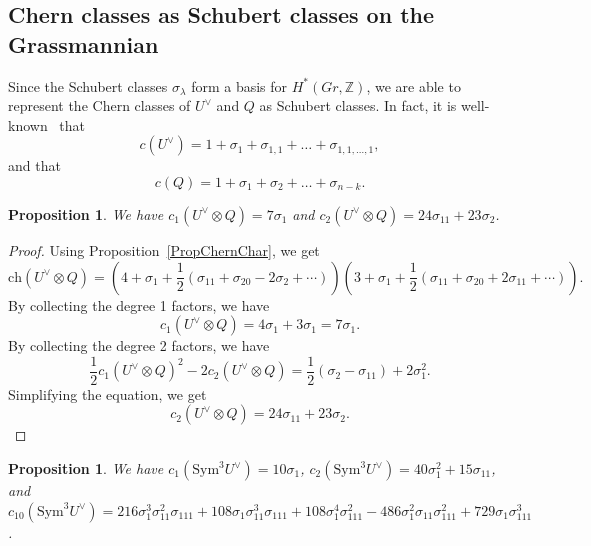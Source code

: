 \documentclass{article}
\newtheorem{proposition}[theorem]{Proposition}
\theoremstyle{definition}
\begin{document}
\subsection{Chern classes as Schubert classes on the Grassmannian}

Since the Schubert classes $\sigma_\lambda$ form a basis for $H^*(Gr, \mathbb Z)$, we are able to represent the Chern classes of $U^\vee$ and $Q$ as Schubert classes. In fact, it is well-known~\cite[Section 5.6.2]{3264} that 
\[
c(U^\vee) = 1 + \sigma_1 + \sigma_{1, 1} + \ldots + \sigma_{1, 1, \ldots, 1},
\] 
and that
\[
c(Q) = 1 + \sigma_1 + \sigma_2 + \ldots + \sigma_{n - k}.
\]

\begin{proposition}\label{PropChernClassOfTensor}
We have $c_1(U^\vee\otimes Q) = 7\sigma_1$ and $c_2(U^\vee\otimes Q) = 24\sigma_{11} + 23\sigma_2$.
\end{proposition}

\begin{proof}
Using Proposition~\ref{PropChernChar}, we get
\[ 
\mathrm{ch}(U^\vee \otimes Q)= \left( 4 + \sigma_1 + \frac{1}{2} \left( \sigma_{11} + \sigma_{20} - 2\sigma_2 + \cdots \right) \right)
\left( 3 + \sigma_1 + \frac{1}{2} \left( \sigma_{11} + \sigma_{20} + 2\sigma_{11} + \cdots \right) \right).
\]
By collecting the degree 1 factors, we have
\[
c_1(U^\vee \otimes Q) = 4\sigma_1 + 3\sigma_1 = 7\sigma_1.
\]
By collecting the degree 2 factors, we have
\[
\frac{1}{2} c_1(U^\vee \otimes Q)^2 - 2c_2(U^\vee \otimes Q) = \frac{1}{2} (\sigma_2 - \sigma_{11}) + 2\sigma_1^2.
\]
Simplifying the equation, we get
\[
c_2(U^\vee \otimes Q) = 24\sigma_{11} + 23\sigma_2.
\]
\end{proof}




\begin{proposition}\label{PropChernClassOfSym}
We have $c_1(\mathrm{Sym}^3 U^\vee) = 10 \sigma_1$, 
$c_2(\mathrm{Sym}^3 U^\vee) = 40 \sigma_1^2 + 15 \sigma_{11}$, and 
$c_{10}(\mathrm{Sym}^3 U^\vee) = 216 \sigma_1^3 \sigma_{11}^2 \sigma_{111} + 108 \sigma_1 \sigma_{11}^3 \sigma_{111} + 108 \sigma_1^4 \sigma_{111}^2 - 486 \sigma_1^2 \sigma_{11} \sigma_{111}^2 + 729 \sigma_1 \sigma_{111}^3$.
\end{proposition}
\end{document}
